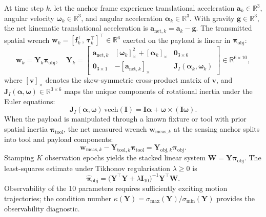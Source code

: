 \documentclass[11pt,a4paper]{article}
\newcommand{\R}{\mathbb{R}}
\newcommand{\ba}{\mathbf{a}}
\newcommand{\bpi}{\boldsymbol{\pi}}
\begin{document}
At time step $k$, let the anchor frame experience translational acceleration
$\ba_k \in \R^3$, angular velocity $\boldsymbol\omega_k \in \R^3$, and angular
acceleration $\boldsymbol\alpha_k \in \R^3$.  With gravity $\mathbf{g} \in \R^3$,
the net kinematic translational acceleration is $\ba_{\mathrm{net},k} = \ba_k - \mathbf{g}$.
The transmitted spatial wrench $\mathbf{w}_k = [\mathbf{f}_k^{\!\top},\, \boldsymbol\tau_k^{\!\top}]^{\!\top} \in \R^6$
exerted on the payload is linear in $\bpi_{\mathrm{obj}}$:
\begin{equation}
  \mathbf{w}_k = \mathbf{Y}_k \bpi_{\mathrm{obj}}, \quad
  \mathbf{Y}_k = \begin{bmatrix}
    \ba_{\mathrm{net},k} & [\boldsymbol\omega_k]_\times^2 + [\boldsymbol\alpha_k]_\times & \mathbf{0}_{3\times6} \\
    \mathbf{0}_{3\times1} & -[\ba_{\mathrm{net},k}]_\times & \mathbf{J}_I(\boldsymbol\alpha_k, \boldsymbol\omega_k)
  \end{bmatrix} \in \R^{6\times10},
  \label{eq:spatial_regressor}
\end{equation}
where $[\mathbf{v}]_\times$ denotes the skew-symmetric cross-product matrix of $\mathbf{v}$,
and $\mathbf{J}_I(\boldsymbol\alpha, \boldsymbol\omega) \in \R^{3\times6}$ maps the unique
components of rotational inertia under the Euler equations:
\begin{equation}
  \mathbf{J}_I(\boldsymbol\alpha, \boldsymbol\omega)\,\mathrm{vech}(\mathbf{I}) = \mathbf{I}\boldsymbol\alpha + \boldsymbol\omega \times (\mathbf{I}\boldsymbol\omega).
\end{equation}
When the payload is manipulated through a known fixture or tool with prior
spatial inertia $\bpi_{\mathrm{tool}}$, the net measured wrench $\mathbf{w}_{\mathrm{meas},k}$
at the sensing anchor splits into tool and payload components:
\begin{equation}
  \mathbf{w}_{\mathrm{meas},k} - \mathbf{Y}_{\mathrm{tool},k}\bpi_{\mathrm{tool}} = \mathbf{Y}_{\mathrm{obj},k}\bpi_{\mathrm{obj}}.
  \label{eq:tool_payload_anchor}
\end{equation}
Stamping $K$ observation epochs yields the stacked linear system $\mathbf{W} = \mathbf{Y}\bpi_{\mathrm{obj}}$.
The least-squares estimate under Tikhonov regularisation $\lambda \ge 0$ is
\begin{equation}
  \hat{\bpi}_{\mathrm{obj}} = \bigl(\mathbf{Y}^{\!\top}\mathbf{Y} + \lambda \mathbf{I}_{10}\bigr)^{-1} \mathbf{Y}^{\!\top}\mathbf{W}.
\end{equation}
Observability of the 10 parameters requires sufficiently exciting motion trajectories;
the condition number $\kappa(\mathbf{Y}) = \sigma_{\max}(\mathbf{Y}) / \sigma_{\min}(\mathbf{Y})$
provides the observability diagnostic.
\end{document}
